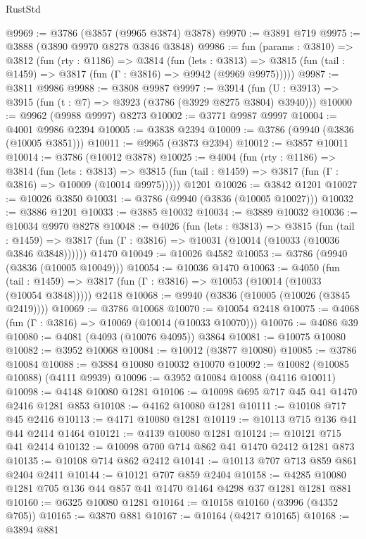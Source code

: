 \begin{lexlean}{RustStd}
\begin{coremodule}
@9969 := @3786 (@3857 (@9965 @3874) @3878)
@9970 := @3891 @719
@9975 := @3888 (@3890 @9970 @8278 @3846 @3848)
@9986 := fun (params : @3810) =>
  @3812
    (fun (rty : @1186) =>
    @3814
      (fun (lets : @3813) =>
      @3815 (fun (tail : @1459) => @3817 (fun (Γ : @3816) => @9942 (@9969 @9975)))))
@9987 := @3811 @9986
@9988 := @3808 @9987
@9997 := @3914 (fun (U : @3913) => @3915 (fun (t : @7) => @3923 (@3786 (@3929 @8275 @3804) @3940)))
@10000 := @9962 (@9988 @9997) @8273
@10002 := @3771 @9987 @9997
@10004 := @4001 @9986 @2394
@10005 := @3838 @2394
@10009 := @3786 (@9940 (@3836 (@10005 @3851)))
@10011 := @9965 (@3873 @2394)
@10012 := @3857 @10011
@10014 := @3786 (@10012 @3878)
@10025 := @4004
    (fun (rty : @1186) =>
    @3814
      (fun (lets : @3813) =>
      @3815 (fun (tail : @1459) => @3817 (fun (Γ : @3816) => @10009 (@10014 @9975)))))
    @1201
@10026 := @3842 @1201
@10027 := @10026 @3850
@10031 := @3786 (@9940 (@3836 (@10005 @10027)))
@10032 := @3886 @1201
@10033 := @3885 @10032
@10034 := @3889 @10032
@10036 := @10034 @9970 @8278
@10048 := @4026
    (fun (lets : @3813) =>
    @3815
      (fun (tail : @1459) =>
      @3817 (fun (Γ : @3816) => @10031 (@10014 (@10033 (@10036 @3846 @3848))))))
    @1470
@10049 := @10026 @4582
@10053 := @3786 (@9940 (@3836 (@10005 @10049)))
@10054 := @10036 @1470
@10063 := @4050
    (fun (tail : @1459) => @3817 (fun (Γ : @3816) => @10053 (@10014 (@10033 (@10054 @3848)))))
    @2418
@10068 := @9940 (@3836 (@10005 (@10026 (@3845 @2419))))
@10069 := @3786 @10068
@10070 := @10054 @2418
@10075 := @4068 (fun (Γ : @3816) => @10069 (@10014 (@10033 @10070)))
@10076 := @4086 @39
@10080 := @4081 (@4093 (@10076 @4095)) @3864
@10081 := @10075 @10080
@10082 := @3952 @10068
@10084 := @10012 (@3877 @10080)
@10085 := @3786 @10084
@10088 := @3884 @10080 @10032 @10070
@10092 := @10082 (@10085 @10088) (@4111 @9939)
@10096 := @3952 @10084 @10088 (@4116 @10011)
@10098 := @4148 @10080 @1281
@10106 := @10098 @695 @717 @45 @41 @1470 @2416 @1281 @853
@10108 := @4162 @10080 @1281
@10111 := @10108 @717 @45 @2416
@10113 := @4171 @10080 @1281
@10119 := @10113 @715 @136 @41 @44 @2414 @1464
@10121 := @4139 @10080 @1281
@10124 := @10121 @715 @41 @2414
@10132 := @10098 @700 @714 @862 @41 @1470 @2412 @1281 @873
@10135 := @10108 @714 @862 @2412
@10141 := @10113 @707 @713 @859 @861 @2404 @2411
@10144 := @10121 @707 @859 @2404
@10158 := @4285 @10080 @1281 @705 @136 @44 @857 @41 @1470 @1464 @4298 @37 @1281 @1281 @881
@10160 := @6325 @10080 @1281
@10164 := @10158 @10160 (@3996 (@4352 @705))
@10165 := @3870 @881
@10167 := @10164 (@4217 @10165)
@10168 := @3894 @881

\end{coremodule}
\end{lexlean}
